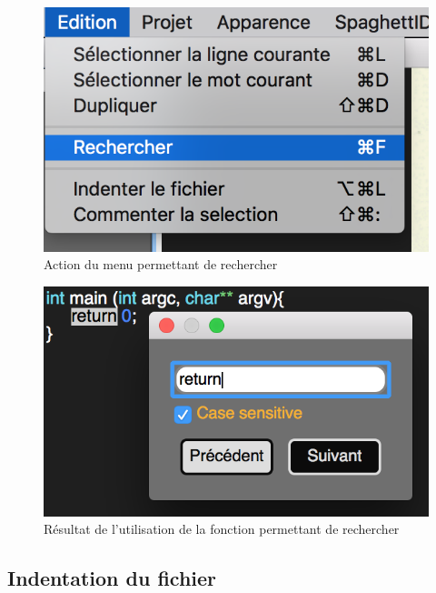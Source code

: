 \documentclass[a4paper,12pt]{article}
\begin{document}
	\begin{figure}[h!]
		\begin{center}
			\includegraphics[scale=0.8]{images/imgs_edit/utilisation_rechercher}
			\caption{Action du menu permettant de rechercher}
		\end{center}
	\end{figure}

	\begin{figure}[h!]
		\begin{center}
			\includegraphics[scale=0.8]{images/imgs_edit/resultat_rechercher}
			\caption{Résultat de l'utilisation de la fonction permettant de rechercher}
		\end{center}
	\end{figure}
	\newpage

	\subsection{Indentation du fichier}
\end{document}
